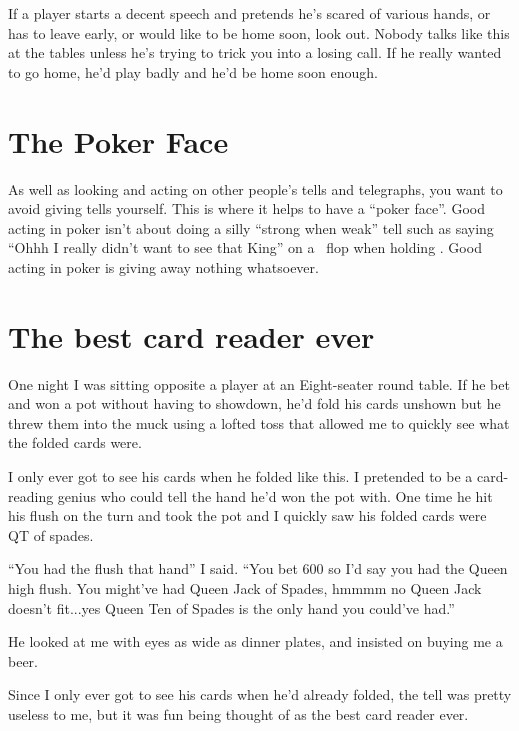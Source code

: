 If a player starts a decent speech and pretends he's scared of various
hands, or has to leave early, or would like to be home soon, look out.
Nobody talks like this at the tables unless he's trying to trick
you into a losing call. If he really wanted to go home, he'd play
badly and he'd be home soon enough.

\section{The Poker Face}

As well as looking and acting on other people's tells and telegraphs,
you want to avoid giving tells yourself. This is where it helps
to have a ``poker face''. Good acting in poker isn't about doing
a silly ``strong when weak'' tell such as saying ``Ohhh I really
didn't want to see that King'' on a \Kh\Qd\eigc\ flop when holding \Ks\Kc.
Good acting in poker is giving away nothing whatsoever.

\section{The best card reader ever}

One night I was sitting opposite a player at an Eight-seater round
table. If he bet and won a pot without having to showdown, he'd
fold his cards unshown but he threw them into the muck using a lofted toss
that allowed me to quickly see what the folded cards were.

I only ever got to see his cards when he folded like this. I pretended
to be a card-reading genius who could tell the hand he'd won the pot
with. One time he hit his flush on the turn and took the pot and I quickly saw
his folded cards were QT of spades.

``You had the flush that hand'' I said. ``You bet 600 so I'd
say you had the Queen high flush. You might've had Queen Jack of Spades,
hmmmm no Queen Jack doesn't fit...yes Queen Ten of Spades is the only hand
you could've had.''

He looked at me with eyes as wide as dinner plates, and insisted on buying
me a beer.

Since I only ever got to see his cards when he'd already folded, the tell
was pretty useless to me, but it was fun being thought of
as the best card reader ever.


